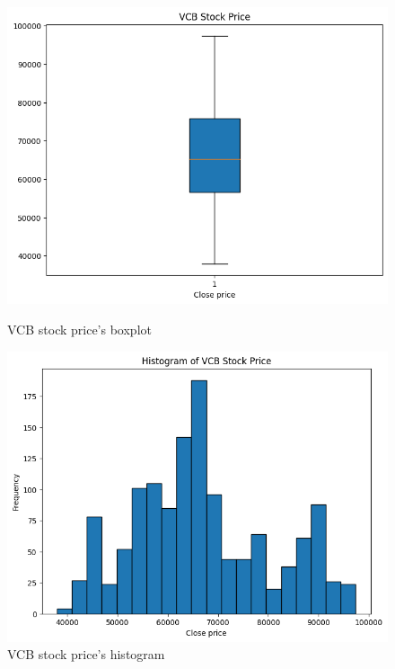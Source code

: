 \documentclass{ieeeojies}
\begin{document}
\begin{figure}[H]
    \centering
    \begin{minipage}{0.23\textwidth}
    \centering
    \includegraphics[width=1\textwidth]{bibliography/boxplot_vcb.png}
    \caption{VCB stock price's boxplot}
    \label{fig:1}
    \end{minipage}
    \hfill
    \begin{minipage}{0.23\textwidth}
    \centering
    \includegraphics[width=1\textwidth]{bibliography/histogram_vcb.png}
    \caption{VCB stock price's histogram}
    \label{fig:2}
    \end{minipage}
\end{figure}
\end{document}
